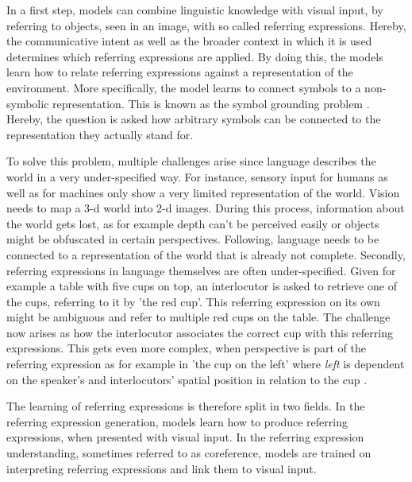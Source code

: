 In a first step, models can combine linguistic knowledge with visual input, by referring to objects, seen in an image, with so called referring expressions.
Hereby, the communicative intent as well as the broader context in which it is used determines which referring expressions are applied.
By doing this, the models learn how to relate referring expressions against a representation of the environment.
More specifically, the model learns to connect symbols to a non-symbolic representation.
This is known as the symbol grounding problem \citep{Harnad1999,Roy2002}.
Hereby, the question is asked how arbitrary symbols can be connected to the representation they actually stand for.

To solve this problem, multiple challenges arise since language describes the world in a very under-specified way.
For instance, sensory input for humans as well as for machines only show a very limited representation of the world.
Vision needs to map a 3-d world into 2-d images.
During this process, information about the world gets lost, as for example depth can't be perceived easily or objects might be obfuscated in certain perspectives.
Following, language needs to be connected to a representation of the world that is already not complete.
Secondly, referring expressions in language themselves are often under-specified.
Given for example a table with five cups on top, an interlocutor is asked to retrieve one of the cups, referring to it by 'the red cup'.
This referring expression on its own might be ambiguous and refer to multiple red cups on the table.
The challenge now arises as how the interlocutor associates the correct cup with this referring expressions.
This gets even more complex, when perspective is part of the referring expression as for example in 'the cup on the left' where \emph{left} is dependent on the speaker's and interlocutors' spatial position in relation to the cup \citep{Dobnik2021}.

The learning of referring expressions is therefore split in two fields.
In the referring expression generation, models learn how to produce referring expressions, when presented with visual input.
In the referring expression understanding, sometimes referred to as coreference, models are trained on interpreting referring expressions and link them to visual input.

